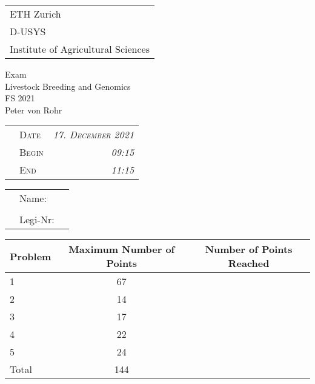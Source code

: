 \documentclass[
]{article}
\author{}
\date{\vspace{-2.5em}}
\begin{document}
\thispagestyle{empty}

\begin{tabular}{l}
ETH Zurich \\
D-USYS\\
Institute of Agricultural Sciences\\
\end{tabular}

\vspace{15ex}
\begin{center}
\huge
Exam\\ \vspace{1ex}
Livestock Breeding and Genomics \\  \vspace{1ex}
FS 2021 \\

\normalsize
\vspace{7ex}
Peter von Rohr 
\end{center}

\vspace{7ex}
\begin{tabular}{p{5cm}lr}
  & \textsc{Date}  & \textsc{\emph{17. December 2021}} \\
  & \textsc{Begin} & \textsc{\emph{09:15 }}\\
  & \textsc{End}   & \textsc{\emph{11:15 }}\\ 
\end{tabular}

\vspace{5ex}

\large
\begin{tabular}{p{2.5cm}p{3cm}p{6cm}}
  &  Name:     &  \\
  &            &  \\
  &  Legi-Nr:  & \\
\end{tabular}
\normalsize

\vspace{9ex}
\begin{center}
\begin{tabular}{|p{3cm}|c|c|}
\hline
Problem  &  Maximum Number of Points  &  Number of Points Reached \\
\hline
1        &  67         & \\
\hline
2        &  14         & \\
\hline
3        &  17         & \\
\hline
4        &  22          & \\
\hline
5        &  24          & \\
\hline
Total    &  144    & \\
\hline
\end{tabular}
\end{center}
\end{document}
